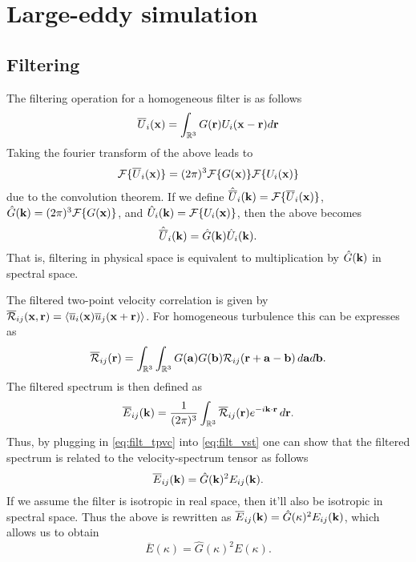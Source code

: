 \documentclass[oneside,a4paper,11pt]{report}
\newcommand{\tpvc}{\mathcal{R}} %
\newcommand{\est}{E}            %
\begin{document}
%
\chapter{Large-eddy simulation}
%

\section{Filtering}
The filtering operation for a homogeneous filter is as follows
\begin{equation}
\overline{U}_i(\mathbf{x}) = \int_{{\mathbb{R}^3}} G(\mathbf{r}) U_i(\mathbf{x} - \mathbf{r} ) d\mathbf{r}
\end{equation}
Taking the fourier transform of the above leads to
\begin{equation}
\mathcal{F}\{ \overline{U}_i(\mathbf{x}) \} = (2 \pi)^3 \mathcal{F} \{ G(\mathbf{x}) \} \mathcal{F} \{ U_i(\mathbf{x}) \}
\end{equation}
due to the convolution theorem. If we define $\hat{\overline{U}}_i (\mathbf{k}) = \mathcal{F}\{ \overline{U}_i(\mathbf{x}) \}$, $\hat{G}(\mathbf{k}) = (2 \pi )^3 \mathcal{F} \{ G(\mathbf{x}) \}$, and $\hat{U}_i(\mathbf{k}) = \mathcal{F} \{ U_i(\mathbf{x}) \}$, then the above becomes
\begin{equation}
\hat{\overline{U}}_i (\mathbf{k}) = \hat{G}(\mathbf{k}) \hat{U}_i(\mathbf{k}).
\end{equation}
That is, filtering in physical space is equivalent to multiplication by $\hat{G}(\mathbf{k})$ in spectral space.

The filtered two-point velocity correlation is given by $\overline{\tpvc}_{ij}(\xvec, \rvec) = \langle \overline{u}_i(\xvec) \overline{u}_j(\xvec + \rvec) \rangle$. For homogeneous turbulence this can be expresses as
\begin{equation}
\label{eq:filt_tpvc}
\overline{\tpvc}_{ij}(\rvec) = \int_\Rthree \int_\Rthree G(\avec) G(\bvec) \tpvc_{ij}(\rvec + \avec - \bvec) \, d\avec d\bvec.
\end{equation}
The filtered spectrum is then defined as
\begin{equation}
\label{eq:filt_vst}
\overline{\est}_{ij}(\kvec) = \frac{1}{ (2\pi)^3 } \int_\Rthree \overline{\tpvc}_{ij} (\rvec) e^{-i \kvec \cdot \rvec} \, d\rvec.
\end{equation}
Thus, by plugging in \cref{eq:filt_tpvc} into \cref{eq:filt_vst} one can show that the filtered spectrum is related to the velocity-spectrum tensor as follows
\begin{equation}
\overline{\est}_{ij} (\kvec) = \hat{G}(\kvec)^2 \est_{ij}(\kvec).
\end{equation}
If we assume the filter is isotropic in real space, then it'll also be isotropic in spectral space. Thus the above is rewritten as $\overline{\est}_{ij} (\kvec) = \hat{G}( \kappa )^2 \est_{ij}(\kvec)$, which allows us to obtain
\begin{equation}
\overline{\est}(\kappa) = \hat{G}(\kappa)^2 \est(\kappa).
\end{equation}
\end{document}

